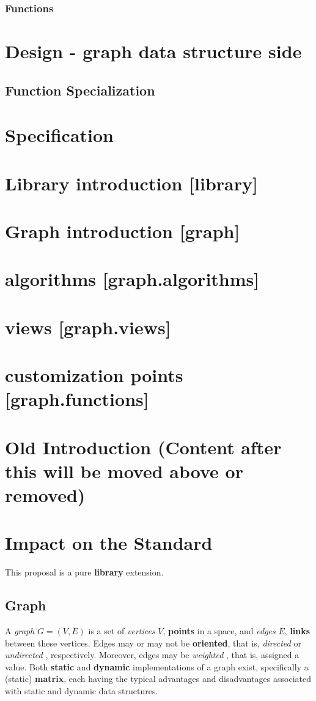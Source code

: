\documentclass[10pt,onecolumn]{article}
\begin{document}
\subsubsection{Functions}
\section{Design - graph data structure side}
\subsection{Function Specialization}
\section{Specification}
\section{Library introduction [library]}
\section{Graph introduction [graph]}
\section{algorithms [graph.algorithms]}
\section{views [graph.views]}
\section{customization points [graph.functions]}


\section{Old Introduction (Content after this will be moved above or removed)}
\section{Impact on the Standard}
This proposal is a pure \textbf{library} extension.

\subsection{Graph}
 A \textit{graph} \cite{REF_graph} $G = (V, E)$ is a set of \textit{vertices} \cite{REF_graph} $V$, \textbf{points} in a space, and \textit{edges} \cite{REF_graph} $E$, \textbf{links} between these vertices. Edges may or may not be \textbf{oriented}, that is, \textit{directed} \cite{REF_graph} or \textit{undirected} \cite{REF_graph}, respectively. Moreover, edges may be \textit{weighted} \cite{REF_graph}, that is, assigned a value. Both \textbf{static} and \textbf{dynamic} implementations of a graph exist, specifically a (static) \textbf{matrix}, each having the typical advantages and disadvantages associated with static and dynamic data structures.
\end{document}
